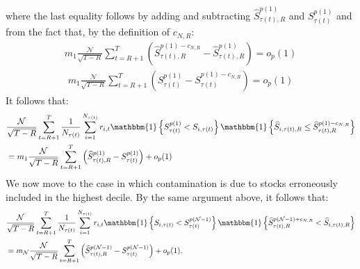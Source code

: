 where the last equality follows by adding and subtracting $\widehat{S}_{\tau(t),R}^{p(1)}$ and $S_{\tau(t) }^{p(1)}$ and from the fact that, by the definition of $c_{N,R}$:
\begin{align}
m_{1}\frac{\mathcal{N}}{\sqrt{T-R}}\sum_{t=R+1}^{T} \left( \widehat{S}_{\tau(t),R}^{p(1)-c_{N,R}} - \widehat{S}_{\tau(t),R}^{p(1)} \right) = o_{p}(1) 
\end{align}
\begin{align}
m_{1}\frac{\mathcal{N}}{\sqrt{T-R}}\sum_{t=R+1}^{T} \left( S_{\tau(t) }^{p(1)} - S_{\tau(t) }^{p(1)-c_{N,R}} \right) = o_{p}(1) 
    \end{align}
It follows that:
\begin{align}
&\frac{\mathcal{N}}{\sqrt{T-R}}\sum_{t=R+1}^{T}\frac{1}{N_{\tau(t)}}\sum_{i=1}^{N_{\tau(t)}} r_{i,t}  \mathbbm{1} \left\{ S_{\tau(t) }^{p(1)} < S_{i,\tau(t) }\right\} \mathbbm{1} \left\{ \widehat{S}_{i,\tau(t),R}\leq \widehat{S}_{\tau(t),R}^{p(1)-c_{N,R}}\right\} \\
&= m_{1}\frac{\mathcal{N}}{\sqrt{T-R}}\sum_{t=R+1}^{T} \left( \widehat{S}_{\tau(t),R}^{p(1)}-S_{\tau(t) }^{p(1)}\right) +o_{p}(1) \notag
\end{align}
We now move to the case in which contamination is due to stocks erroneously included in the highest decile. By the same argument above, it follows that:
\begin{align}
&\frac{\mathcal{N}}{\sqrt{T-R}}\sum_{t=R+1}^{T}\frac{1}{N_{\tau(t)}}\sum_{i=1}^{N_{\tau(t)}}r_{i,t} \mathbbm{1} \left\{S_{i,\tau(t) } < S_{\tau(t)}^{p(\mathcal{N}-1)}\right\} \mathbbm{1} \left\{ \widehat{S}_{\tau(t),R}^{p(\mathcal{N}-1)+c_{N,R}} < \widehat{S}_{i,\tau(t),R} \right\} \\
&= m_{\mathcal{N}}\frac{\mathcal{N}}{\sqrt{T-R}}\sum_{t=R+1}^{T} \left( \widehat{S}_{\tau(t),R}^{p(\mathcal{N}-1)} -S_{\tau(t) }^{p(\mathcal{N}-1)}\right)+o_{p}(1). \notag
\end{align}
